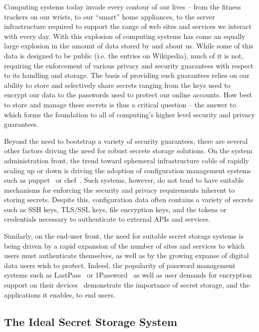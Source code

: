 Computing systems today invade every contour of our lives -- from the
fitness trackers on our wrists, to our ``smart'' home appliances, to
the server infrastructure required to support the range of web sites
and services we interact with every day. With this explosion of
computing systems has come an equally large explosion in the amount of
data stored by and about us. While some of this data is designed to be
public (i.e. the entries on Wikipedia), much of it is not, requiring
the enforcement of various privacy and security guarantees with
respect to its handling and storage. The basis of providing such
guarantees relies on our ability to store and selectively share
secrets ranging from the keys used to encrypt our data to the
passwords used to protect our online accounts. How best to store and
manage these secrets is thus a critical question -- the answer to
which forms the foundation to all of computing's higher level security
and privacy guarantees.

Beyond the need to bootstrap a variety of security guarantees, there
are several other factors driving the need for robust secrete storage
solutions. On the system administration front, the trend toward
ephemeral infrastructure cable of rapidly scaling up or down is
driving the adoption of configuration management systems such as
puppet~\cite{puppet} or chef~\cite{chef}. Such systems, however, do
not tend to have suitable mechanisms for enforcing the security and
privacy requirements inherent to storing secrets. Despite this,
configuration data often contains a variety of secrets such as SSH
keys, TLS/SSL keys, file encryption keys, and the tokens or
credentials necessary to authenticate to external APIs and services.

Similarly, on the end-user front, the need for suitable secret storage
systems is being driven by a rapid expansion of the number of sites
and services to which users must authenticate themselves, as well as
by the growing expanse of digital data users wish to protect. Indeed,
the popularity of password management systems such as
LastPass~\cite{lastpass} or 1Password~\cite{onepassword} as well as
user demands for encryption support on their
devices~\cite{intercept-cookencryption} demonstrate the importance of
secret storage, and the applications it enables, to end users.

\subsection{The Ideal Secret Storage System}

